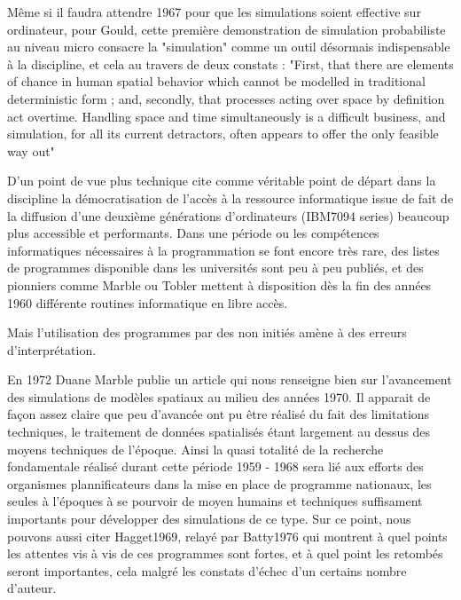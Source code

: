 {Même si il faudra attendre 1967 \autocite{Hagerstrand1967} pour que les simulations soient effective sur ordinateur, pour Gould, cette première demonstration de simulation probabiliste au niveau micro consacre la "simulation" comme un outil désormais indispensable à la discipline, et cela au travers de deux constats : "First, that there are elements of chance in human spatial behavior which cannot be modelled in traditional deterministic form ; and, secondly, that processes acting over space by definition act overtime. Handling space and time simultaneously is a difficult business, and simulation, for all its current detractors, often appears to offer the only feasible way out" \autocite{Gould1970}


D'un point de vue plus technique \autocite{Haggett1969} cite comme véritable point de départ dans la discipline la  démocratisation de l'accès à la ressource informatique issue de fait de la diffusion d'une deuxième générations d'ordinateurs (IBM7094 series) beaucoup plus accessible et performants. Dans une période ou les compétences informatiques nécessaires à la programmation se font encore très rare, des listes de programmes disponible dans les universités sont peu à peu publiés, et des pionniers comme Marble ou Tobler mettent à disposition dès la fin des années 1960 différente routines informatique en libre accès.


Mais l'utilisation des programmes par des non initiés amène à des erreurs d'interprétation. 

En 1972 Duane Marble \autocite{Marble1972} publie un article qui nous renseigne bien sur l'avancement des simulations de modèles spatiaux au milieu des années 1970. Il apparait de façon assez claire que peu d'avancée ont pu être réalisé du fait des limitations techniques, le traitement de données spatialisés étant largement au dessus des moyens techniques de l'époque. Ainsi la quasi totalité de la recherche fondamentale réalisé durant cette période 1959 - 1968 sera lié aux efforts des organismes plannificateurs dans la mise en place de programme nationaux, les seules à l'époques à se pourvoir de moyen humains et techniques suffisament importants pour développer des simulations de ce type. Sur ce point, nous pouvons aussi citer Hagget1969, relayé par Batty1976 qui montrent à quel points les attentes vis à vis de ces programmes sont fortes\autocite{Haggett1969}, et à quel point les retombés seront importantes, cela malgré les constats d'échec d'un certains nombre d'auteur. 

}
